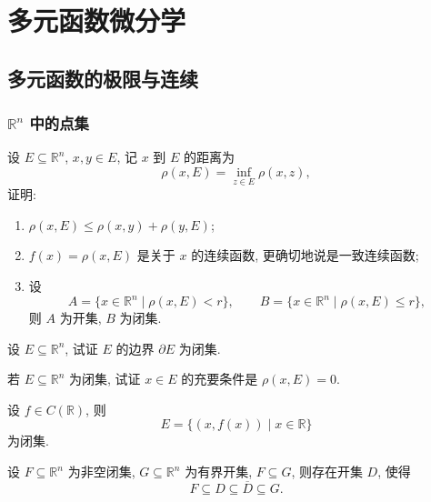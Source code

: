 \documentclass[../../数学分析培优讲义.tex]{subfiles}
\begin{document}
\setcounter{chapter}{9}
\pagestyle{fancy}

\chapter{多元函数微分学}


\section{多元函数的极限与连续}


\subsection{\texorpdfstring{$\mathbb{R}^n$}{Rⁿ} 中的点集}

\begin{example}[\markstar]
设 $E\subseteq\mathbb{R}^n$, $x,y\in E$, 记 $x$ 到 $E$ 的距离为
\[
    \rho(x,E)=\inf_{z\in E}\rho(x,z),
\]
证明:
\begin{enumerate}[label=(\arabic*)]
    \item $\rho(x,E)\leq\rho(x,y)+\rho(y,E)$;
    \item $f(x)=\rho(x,E)$ 是关于 $x$ 的连续函数, 更确切地说是一致连续函数;
    \item 设
    \[
        A=\{x\in\mathbb{R}^n\mid \rho(x,E)<r\},\qquad
        B=\{x\in\mathbb{R}^n\mid \rho(x,E)\leq r\},
    \]
    则 $A$ 为开集, $B$ 为闭集.
\end{enumerate}
\end{example}
\exampleblank

\begin{example}
设 $E\subseteq\mathbb{R}^n$, 试证 $E$ 的边界 $\partial E$ 为闭集.
\end{example}
\exampleblank

\begin{example}
若 $E\subseteq\mathbb{R}^n$ 为闭集, 试证 $x\in E$ 的充要条件是 $\rho(x,E)=0$.
\end{example}
\exampleblank

\begin{example}
设 $f\in C(\mathbb{R})$, 则
\[
    E=\{(x,f(x))\mid x\in\mathbb{R}\}
\]
为闭集.
\end{example}
\exampleblank

\begin{example}
设 $F\subseteq\mathbb{R}^n$ 为非空闭集, $G\subseteq\mathbb{R}^n$ 为有界开集, $F\subseteq G$, 则存在开集 $D$, 使得
\[
    F\subseteq D\subseteq\overline D\subseteq G.
\]
\end{example}
\exampleblank
\end{document}
